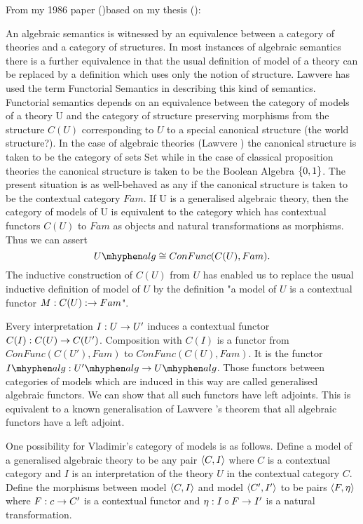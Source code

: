 \note From my 1986 paper (\cite{Cartmell86})based on my thesis (\cite{Cartmell78}):
\begin{tightquote}
An algebraic semantics is witnessed by an equivalence between a category of
theories and a category of structures. In most instances of algebraic semantics
there is a further equivalence in that the usual definition of model of a theory can
be replaced by a definition which uses only the notion of structure. Lawvere has
used the term Functorial Semantics in describing this kind of semantics.
Functorial semantics depends on an equivalence between the category of models
of a theory U and the category of structure preserving morphisms from the
structure $C(U)$ corresponding to $U$ to a special canonical structure (the world
structure?). In the case of algebraic theories (Lawvere \cite{LawvereAlgebraicTheories}) the canonical structure
is taken to be the category of sets Set while in the case of classical proposition
theories the canonical structure is taken to be the Boolean Algebra $\left\{0, 1\right\}$.
The present situation is as well-behaved as any if the canonical structure is
taken to be the contextual category $Fam$.
If U is a generalised algebraic theory, then the category of models of U is
equivalent to the category which has contextual functors $C(U)$ to $Fam$ as objects
and natural transformations as morphisms. Thus we can assert
\begin{equation*}
\Ualg \cong ConFunc(C(U), Fam).
\end{equation*}
The inductive construction of $C(U)$ from $U$ has enabled us to replace the usual 
inductive definition of model of $U$ by the definition "a model of $U$ is a contextual
functor $M: C(U): \rightarrow Fam$".

Every interpretation $I:U \rightarrow U'$ induces a contextual functor 
$C(I):C(U) \rightarrow C(U')$. Composition with $C(I)$ is a functor from 
$ConFunc(C(U'),Fam)$ to
$ConFunc(C(U),Fam)$. It is the functor $\Ialg:\Upalg \morph \Ualg$. Those functors
between categories of models which are induced in this way are called generalised
algebraic functors. We can show that all such functors have left adjoints. This is
equivalent to a known generalisation of Lawvere \cite{LawvereAlgebraicTheories}'s theorem that all algebraic
functors have a left adjoint. 
\end{tightquote}

\begin{oldtt}
\note
One possibility for Vladimir's category of models is as follows. Define a model of a generalised algebraic theory to be any pair $\langle C,I\rangle$ where $C$ is a contextual category and $I$ is an interpretation of the theory $U$ in the contextual category $C$. Define the morphisms between
model $\langle C,I\rangle$ and model $\langle C',I'\rangle$ to be pairs $\langle F, \eta\rangle$ where
$F: c \rightarrow C'$ is a contextual functor and $\eta: I \circ F \rightarrow  I'$ is a natural transformation.
\end{oldtt}



